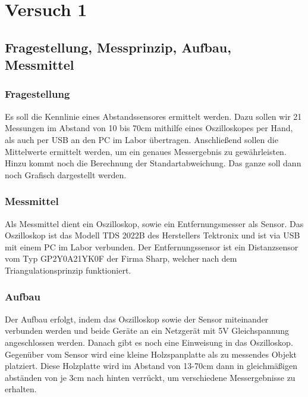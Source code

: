 \documentclass[TGAI_Laborbericht.tex]{subfiles}
\begin{document}
\chapter{Versuch 1}
\label{chap:VERSUCH_1}


\section{Fragestellung, Messprinzip, Aufbau, Messmittel}
\label{chap:VERSUCH_1_FRAGESTELLUNG}

\subsection*{Fragestellung}
Es soll die Kennlinie eines Abstandssensores ermittelt werden. Dazu sollen wir 21 Messungen im Abstand von 10 bis 70cm mithilfe eines Oszilloskopes per Hand, als auch per USB an den PC im Labor übertragen. Anschließend sollen die Mittelwerte ermittelt werden, um ein genaues Messergebnis zu gewährleisten. Hinzu kommt noch die Berechnung der Standartabweichung. Das ganze soll dann noch Grafisch dargestellt werden.

\subsection*{Messmittel}
Als Messmittel dient ein Oszilloskop, sowie ein Entfernungsmesser als
Sensor. Das Oszilloskop ist das Modell TDS 2022B des Herstellers Tektronix und ist via USB mit einem PC im Labor verbunden. Der Entfernungssensor ist ein Distanzsensor vom Typ GP2Y0A21YK0F der
Firma Sharp, welcher nach dem Triangulationsprinzip funktioniert.

\subsection*{Aufbau}
Der Aufbau erfolgt, indem das Oszilloskop sowie der Sensor miteinander verbunden werden und beide Geräte an ein Netzgerät mit 5V Gleichspannung angeschlossen werden.
Danach gibt es noch eine Einweisung in das Oszilloskop. Gegenüber vom Sensor wird eine kleine Holzspanplatte als zu messendes Objekt platziert. Diese Holzplatte wird im Abstand von 13-70cm dann in gleichmäßigen abständen von je 3cm nach hinten verrückt, um verschiedene Messergebnisse zu erhalten.
\end{document}
